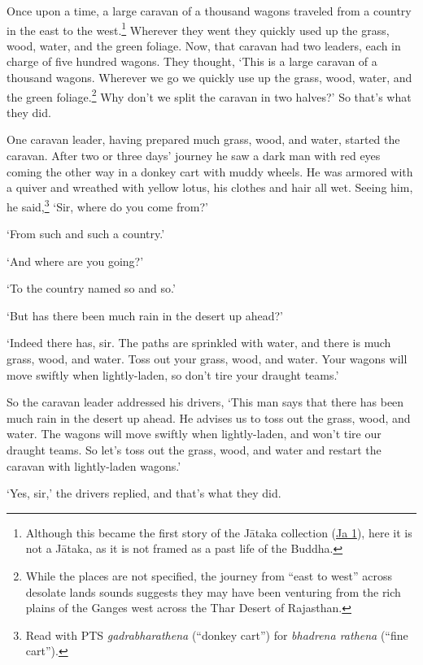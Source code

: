 \documentclass[12pt,openany]{book}%
\begin{document}
Once upon a time, a large caravan of a thousand wagons traveled from a country in the east to the west.\footnote{Although this became the first story of the \textsanskrit{Jātaka} collection (\href{https://suttacentral.net/ja1/en/sujato}{Ja 1}), here it is not a \textsanskrit{Jātaka}, as it is not framed as a past life of the Buddha. } Wherever they went they quickly used up the grass, wood, water, and the green foliage. Now, that caravan had two leaders, each in charge of five hundred wagons. They thought, ‘This is a large caravan of a thousand wagons. Wherever we go we quickly use up the grass, wood, water, and the green foliage.\footnote{While the places are not specified, the journey from “east to west” across desolate lands sounds suggests they may have been venturing from the rich plains of the Ganges west across the Thar Desert of Rajasthan. } Why don’t we split the caravan in two halves?’ So that’s what they did. 

One caravan leader, having prepared much grass, wood, and water, started the caravan. After two or three days’ journey he saw a dark man with red eyes coming the other way in a donkey cart with muddy wheels. He was armored with a quiver and wreathed with yellow lotus, his clothes and hair all wet. Seeing him, he said,\footnote{Read with PTS \textit{gadrabharathena} (“donkey cart”) for \textit{bhadrena rathena} (“fine cart”). } ‘Sir, where do you come from?’ 

‘From such and such a country.’ 

‘And where are you going?’ 

‘To the country named so and so.’ 

‘But has there been much rain in the desert up ahead?’ 

‘Indeed there has, sir. The paths are sprinkled with water, and there is much grass, wood, and water. Toss out your grass, wood, and water. Your wagons will move swiftly when lightly-laden, so don’t tire your draught teams.’ 

So the caravan leader addressed his drivers, ‘This man says that there has been much rain in the desert up ahead. He advises us to toss out the grass, wood, and water. The wagons will move swiftly when lightly-laden, and won’t tire our draught teams. So let’s toss out the grass, wood, and water and restart the caravan with lightly-laden wagons.’ 

‘Yes, sir,’ the drivers replied, and that’s what they did. 
\end{document}
